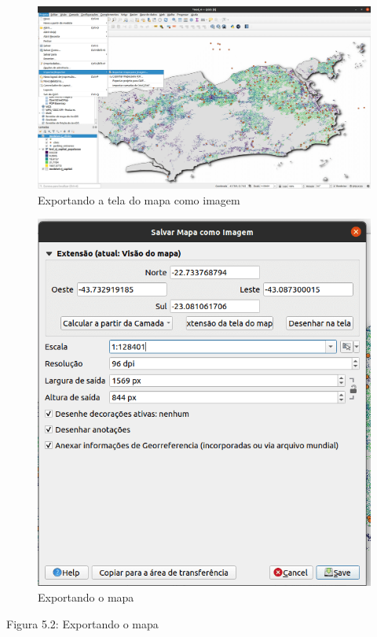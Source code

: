 \documentclass[
]{krantz}
\begin{document}
\begin{figure}
\centering
\includegraphics{media/modulo5/export-map-canvas-image.png}
\caption{Exportando a tela do mapa como imagem}
\end{figure}

\begin{figure}
\centering
\includegraphics{media/modulo5/export-map-canvas.png}
\caption{Exportando o mapa}
\end{figure}

Figura 5.2: Exportando o mapa
\end{document}

